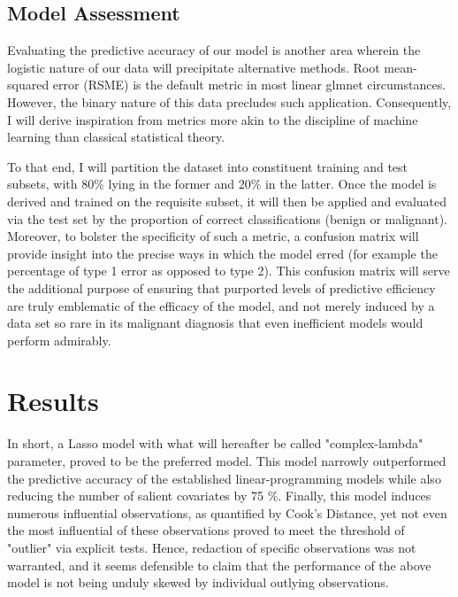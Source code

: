 \documentclass[11pt]{article}
\begin{document}
\subsection{Model Assessment}

	Evaluating the predictive accuracy of our model is another area wherein the logistic nature of our data will precipitate alternative methods.  Root mean-squared error (RSME) is the default metric in most linear glmnet circumstances.  However, the binary nature of this data precludes such application.  Consequently, I will derive inspiration from metrics more akin to the discipline of machine learning than classical statistical theory.  
	
	To that end, I will partition the dataset into constituent training and test subsets, with 80\% lying in the former and 20\% in the latter.  Once the model is derived and trained on the requisite subset, it will then be applied and evaluated via the test set by the proportion of correct classifications (benign or malignant).  Moreover, to bolster the specificity of such a metric, a confusion matrix will provide insight into the precise ways in which the model erred (for example the percentage of type 1 error as opposed to type 2).  This confusion matrix will serve the additional purpose of ensuring that purported levels of predictive efficiency are truly emblematic of the efficacy of the model, and not merely induced by a data set so rare in its malignant diagnosis that even inefficient models would perform admirably.  
	
	\section{Results}

	In short, a Lasso model with what will hereafter be called "complex-lambda" parameter, proved to be the preferred model.  This model narrowly outperformed the predictive accuracy of the established linear-programming models while also reducing the number of salient covariates by 75 \%.  Finally, this model induces numerous influential observations, as quantified by Cook's Distance, yet not even the most influential of these observations proved to meet the threshold of "outlier" via explicit tests.  Hence, redaction of specific observations was not warranted, and it seems defensible to claim that the performance of the above model is not being unduly skewed by individual outlying observations.  
	
\end{document}
